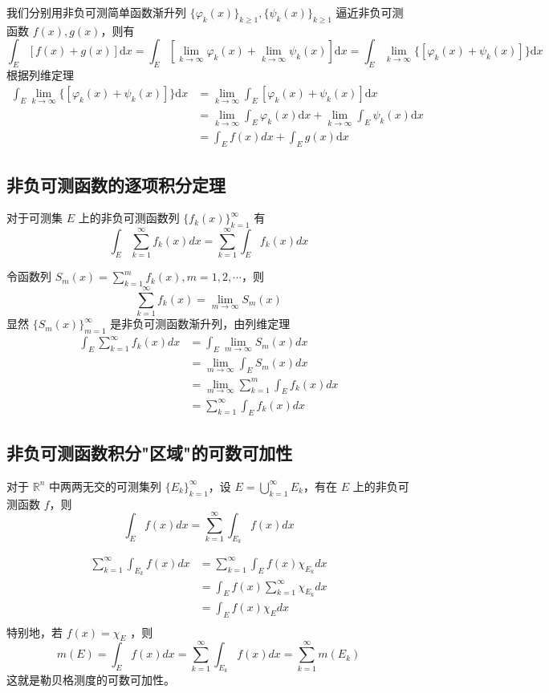 \documentclass{ctexbook}
\newcommand{\no}{\noindent}
\newcommand{\pro}{\no{\bf 证明：}}
\newcommand{\R}{\mathbb{R}}
\begin{document}
我们分别用非负可测简单函数渐升列 $\{\varphi_k(x)\}_{k\ge 1},\{\psi_k(x)\}_{k\ge 1}$ 逼近非负可测函数 $f(x),g(x)$，则有
\[
\int_E [f(x) + g(x)] \mathrm {d}x = \int_E \left[\lim_{k\to\infty} \varphi_k(x) + \lim_{k\to\infty} \psi_k(x)\right] \mathrm {d}x=\int_E \lim_{k\to\infty}\{\left[ \varphi_k(x) + \psi_k(x)\right]\} \mathrm {d}x
\]
根据列维定理
\[
\begin{aligned}
	\int_E \lim_{k\to\infty}\{\left[ \varphi_k(x) + \psi_k(x)\right]\} \mathrm {d}x &= \lim_{k\to\infty} \int_E\left[ \varphi_k(x) + \psi_k(x)\right] \mathrm {d}x\\
	&= \lim_{k\to\infty} \int_E \varphi_k(x) \mathrm {d}x + \lim_{k\to\infty} \int_E\psi_k(x) \mathrm {d}x\\
	&= \int_E f(x) dx + \int_E g(x) \mathrm {d}x
\end{aligned}
\]

\subsection{非负可测函数的逐项积分定理}

对于可测集 $E$ 上的非负可测函数列 $\{ f_k(x) \}_{k=1}^\infty$ 有
\[
\int_E \sum_{k=1}^\infty f_k(x) dx = \sum_{k=1}^\infty \int_E f_k(x) dx
\]

\pro

令函数列 $S_m(x) = \sum\limits_{k=1}^m f_k(x), m=1, 2, \cdots$，则
\[
\sum\limits_{k=1}^\infty f_k(x) = \lim_{m\to\infty} S_m(x)
\]
显然 $\{S_m(x)\}_{m=1}^\infty$ 是非负可测函数渐升列，由列维定理
\[
\begin{aligned}
	\int_E \sum_{k=1}^\infty f_k(x) dx &= \int_E\lim_{m\to\infty} S_m(x) dx \\
	&= \lim_{m\to\infty} \int_E S_m(x) dx\\
	&= \lim_{m\to\infty} \sum\limits_{k=1}^m \int_E f_k(x) dx\\
	&= \sum_{k=1}^\infty \int_E f_k(x) dx
\end{aligned}
\]

\subsection{非负可测函数积分"区域"的可数可加性}

对于 $\R^n$ 中两两无交的可测集列 $\{E_k\}_{k=1}^\infty$，设 $E = \bigcup\limits_{k=1}^\infty E_k$，有在 $E$ 上的非负可测函数 $f$，则
\[
\int_E f(x) dx = \sum_{k=1}^\infty \int_{E_k} f(x)dx
\]

\pro
\[
\begin{aligned}
	\sum_{k=1}^\infty \int_{E_k} f(x)dx &= \sum_{k=1}^\infty \int_{E} f(x) \chi_{E_k}dx\\
	&= \int_{E} f(x) \sum_{k=1}^\infty \chi_{E_k}dx\\
	&= \int_{E} f(x) \chi_{E}dx\\
\end{aligned}
\]
特别地，若 $f(x) = \chi_{E}$ ，则
\[
m(E)=\int_E f(x) dx=\sum_{k=1}^\infty \int_{E_k} f(x)dx = \sum_{k=1}^\infty m(E_k) 
\]
这就是勒贝格测度的可数可加性。
\end{document}

